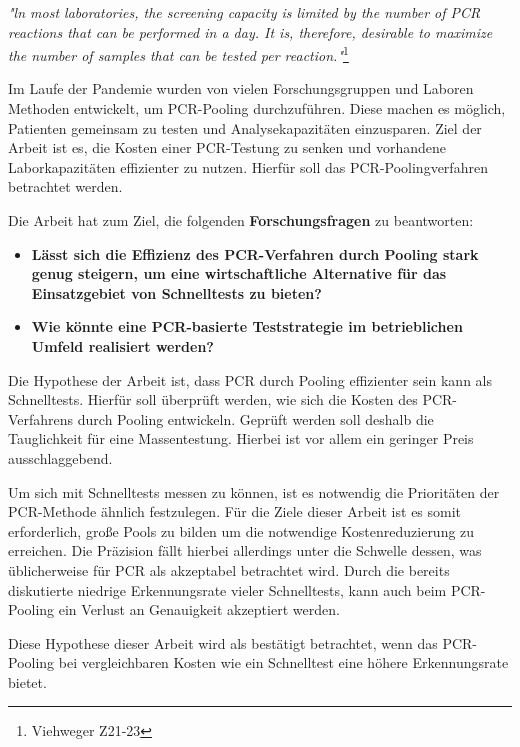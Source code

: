 \textit{"ln most laboratories, the screening capacity is limited by the number of PCR reactions that can be performed in a day. It is, therefore, desirable to maximize the number of samples that can be tested per reaction."}\footnote{Viehweger Z21-23}

Im Laufe der Pandemie wurden von vielen Forschungsgruppen und Laboren Methoden entwickelt, um PCR-Pooling durchzuführen.
Diese machen es möglich, Patienten gemeinsam zu testen und Analysekapazitäten einzusparen.
Ziel der Arbeit ist es, die Kosten einer PCR-Testung zu senken und vorhandene Laborkapazitäten effizienter zu nutzen.
Hierfür soll das PCR-Poolingverfahren betrachtet werden.

Die Arbeit hat zum Ziel, die folgenden \textbf{Forschungsfragen} zu beantworten:

\begin{itemize}
	\item \textbf{Lässt sich die Effizienz des PCR-Verfahren durch Pooling stark genug steigern, um eine wirtschaftliche Alternative für das Einsatzgebiet von Schnelltests zu bieten?}
	\item \textbf{Wie könnte eine PCR-basierte Teststrategie im betrieblichen Umfeld realisiert werden?}
\end{itemize}

Die Hypothese der Arbeit ist, dass PCR durch Pooling effizienter sein kann als Schnelltests.
Hierfür soll überprüft werden, wie sich die Kosten des PCR-Verfahrens durch Pooling entwickeln.
Geprüft werden soll deshalb die Tauglichkeit für eine Massentestung.
Hierbei ist vor allem ein geringer Preis ausschlaggebend.

Um sich mit Schnelltests messen zu können, ist es notwendig die Prioritäten der PCR-Methode ähnlich festzulegen.
Für die Ziele dieser Arbeit ist es somit erforderlich, große Pools zu bilden um die notwendige Kostenreduzierung zu erreichen.
Die Präzision fällt hierbei allerdings unter die Schwelle dessen, was üblicherweise für PCR als akzeptabel betrachtet wird.
Durch die bereits diskutierte niedrige Erkennungsrate vieler Schnelltests, kann auch beim PCR-Pooling ein Verlust an Genauigkeit akzeptiert werden.

Diese Hypothese dieser Arbeit wird als bestätigt betrachtet, wenn das PCR-Pooling bei vergleichbaren Kosten wie ein Schnelltest eine höhere Erkennungsrate bietet.

